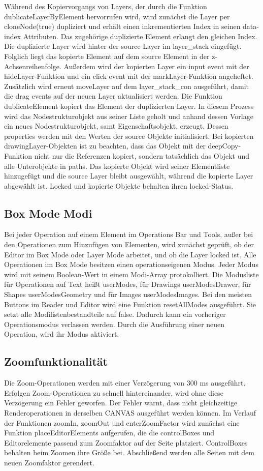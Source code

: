 Während des Kopiervorgangs von Layers, der durch die Funktion dublicateLayerByElement hervorrufen wird, wird zunächst die Layer per cloneNode(true) dupliziert und erhält einen inkrementierten Index in seinen data-index Attributen. Das zugehörige duplizierte Element erlangt den gleichen Index. Die duplizierte Layer wird hinter der source Layer im layer\_stack eingefügt. Folglich liegt das kopierte Element auf dem source Element in der z-Achsenreihenfolge. Außerdem wird der kopierten Layer ein input event mit der hideLayer-Funktion und ein click event mit der markLayer-Funktion angeheftet. Zusätzlich wird erneut moveLayer auf dem layer\_stack\_con ausgeführt, damit die drag events auf der neuen Layer aktualisiert werden. Die Funktion dublicateElement kopiert das Element der duplizierten Layer. In diesem Prozess wird das Nodestrukturobjekt aus seiner Liste geholt und anhand dessen Vorlage ein neues Nodestrukturobjekt, samt Eigenschaftsobjekt, erzeugt. Dessen properties werden mit den Werten der source Objekte initialisiert. Bei kopierten drawingLayer-Objekten ist zu beachten, dass das Objekt mit der deepCopy-Funktion nicht nur die Referenzen kopiert, sondern tatsächlich das Objekt und alle Unterobjekte in paths. Das kopierte Objekt wird seiner Elementliste hinzugefügt und die source Layer bleibt ausgewählt, während die kopierte Layer abgewählt ist. Locked und kopierte Objekte behalten ihren locked-Status.

\subsection{Box Mode Modi}
Bei jeder Operation auf einem Element im Operations Bar und Tools, außer bei den Operationen zum Hinzufügen von Elementen, wird zunächst geprüft, ob der Editor im Box Mode oder Layer Mode arbeitet, und ob die Layer locked ist. Alle Operationen im Box Mode besitzen einen operationseigenen Modus. Jeder Modus wird mit seinem Boolean-Wert in einem Modi-Array protokolliert. Die Modusliste für Operationen auf Text heißt userModes, für Drawings userModesDrawer, für Shapes userModesGeometry und für Images userModesImages. Bei den meisten Buttons im Reader und Editor wird eine Funktion resetAllModes ausgeführt. Sie setzt alle Modilistenbestandteile auf false. Dadurch kann ein vorheriger Operationsmodus verlassen werden. Durch die Ausführung einer neuen Operation, wird ihr Modus aktiviert.

\subsection{Zoomfunktionalität}
Die Zoom-Operationen werden mit einer Verzögerung von 300 ms ausgeführt. Erfolgen Zoom-Operationen zu schnell hintereinander, wird ohne diese Verzögerung ein Fehler geworfen. Der Fehler warnt, dass nicht gleichzeitige Renderoperationen in derselben CANVAS ausgeführt werden können. Im Verlauf der Funktionen zoomIn, zoomOut und enterZoomFactor wird zunächst eine Funktion placeEditorElements aufgerufen, die die controlBoxes und Editorelemente passend zum Zoomfaktor auf der Seite platziert. ControlBoxes behalten beim Zoomen ihre Größe bei. Abschließend werden alle Seiten mit dem neuen Zoomfaktor gerendert.

